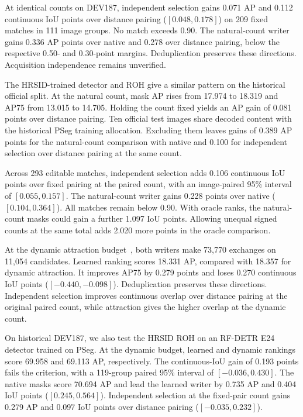 \documentclass[journal]{IEEEtran}
\begin{document}
At identical counts on DEV187, independent selection gains 0.071 AP and 0.112 continuous IoU points over distance pairing (\([0.048,0.178]\)) on 209 fixed matches in 111 image groups. No match exceeds 0.90. The natural-count writer gains 0.336 AP points over native and 0.278 over distance pairing, below the respective 0.50- and 0.30-point margins. Deduplication preserves these directions. Acquisition independence remains unverified.

The HRSID-trained detector and ROH give a similar pattern on the historical official split. At the natural count, mask AP rises from 17.974 to 18.319 and AP75 from 13.015 to 14.705. Holding the count fixed yields an AP gain of 0.081 points over distance pairing. Ten official test images share decoded content with the historical PSeg training allocation. Excluding them leaves gains of 0.389 AP points for the natural-count comparison with native and 0.100 for independent selection over distance pairing at the same count.

Across 293 editable matches, independent selection adds 0.106 continuous IoU points over fixed pairing at the paired count, with an image-paired 95\% interval of \mbox{\([0.055,0.157]\)}. The natural-count writer gains 0.228 points over native (\([0.104,0.364]\)). All matches remain below 0.90. With oracle ranks, the natural-count masks could gain a further 1.097 IoU points. Allowing unequal signed counts at the same total adds 2.020 more points in the oracle comparison.

At the dynamic attraction budget~\cite{atkinson}, both writers make 73,770 exchanges on 11,054 candidates. Learned ranking scores 18.331 AP, compared with 18.357 for dynamic attraction. It improves AP75 by 0.279 points and loses 0.270 continuous IoU points (\([-0.440,-0.098]\)). Deduplication preserves these directions. Independent selection improves continuous overlap over distance pairing at the original paired count, while attraction gives the higher overlap at the dynamic count.

On historical DEV187, we also test the HRSID ROH on an RF-DETR E24 detector trained on PSeg. At the dynamic budget, learned and dynamic rankings score 69.958 and 69.113 AP, respectively. The continuous-IoU gain of 0.193 points fails the criterion, with a 119-group paired 95\% interval of \([-0.036,0.430]\). The native masks score 70.694 AP and lead the learned writer by 0.735 AP and 0.404 IoU points (\([0.245,0.564]\)). Independent selection at the fixed-pair count gains 0.279 AP and 0.097 IoU points over distance pairing (\([-0.035,0.232]\)).
\end{document}

